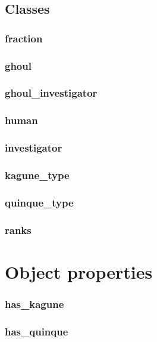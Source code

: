\documentclass{article}
\begin{document}
\subsection*{Classes}

\subsubsection*{fraction}

\subsubsection*{ghoul}

\subsubsection*{ghoul\_investigator}

\subsubsection*{human}

\subsubsection*{investigator}

\subsubsection*{kagune\_type}

\subsubsection*{quinque\_type}

\subsubsection*{ranks}

\section*{Object properties}\subsubsection*{has\_kagune}

\subsubsection*{has\_quinque}
\end{document}
